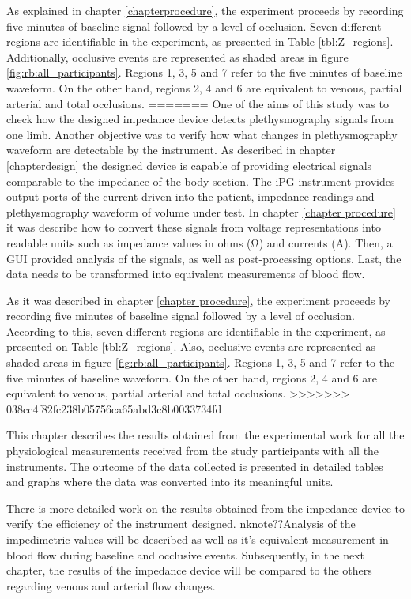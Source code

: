 As explained in chapter \ref{chapterprocedure}, the experiment proceeds by recording five minutes of baseline signal followed by a level of occlusion. Seven different regions are identifiable in the experiment, as presented in Table \ref{tbl:Z_regions}. Additionally, occlusive events are represented as shaded areas in figure \ref{fig:rb:all_participants}. Regions 1, 3, 5 and 7 refer to the five minutes of baseline waveform. On the other hand, regions 2, 4 and 6 are equivalent to venous, partial arterial and total occlusions.
=======
One of the aims of this study was to check how the designed impedance device detects plethysmography signals from one limb. Another objective was to verify how what changes in plethysmography waveform are detectable by the instrument. As described in chapter \ref{chapterdesign} the designed device is capable of providing electrical signals comparable to the impedance of the body section. The iPG instrument provides output ports of the current driven into the patient, impedance readings and plethysmography waveform of volume under test. In chapter \ref{chapter procedure} it was describe how to convert these signals from voltage representations into readable units such as impedance values in ohms (\si{\ohm}) and currents (\si{\ampere}). Then, a GUI provided analysis of the signals, as well as post-processing options. Last, the data needs to be transformed into equivalent measurements of blood flow.

As it was described in chapter \ref{chapter procedure}, the experiment proceeds by recording five minutes of baseline signal followed by a level of occlusion. According to this, seven different regions are identifiable in the experiment, as presented on Table \ref{tbl:Z_regions}. Also, occlusive events are represented as shaded areas in figure \ref{fig:rb:all_participants}. Regions 1, 3, 5 and 7 refer to the five minutes of baseline waveform. On the other hand, regions 2, 4 and 6 are equivalent to venous, partial arterial and total occlusions.
>>>>>>> 038cc4f82fc238b05756ca65abd3c8b0033734fd

This chapter describes the results obtained from the experimental work for all the physiological measurements received from the study participants with all the instruments. The outcome of the data collected is presented in detailed tables and graphs where the data was converted into its meaningful units. 

There is more detailed work on the results obtained from the impedance device to verify the efficiency of the instrument designed. nknote{??}Analysis of the impedimetric values will be described as well as it's equivalent measurement in blood flow during baseline and occlusive events. Subsequently, in the next chapter, the results of the impedance device will be compared to the others regarding venous and arterial flow changes.

